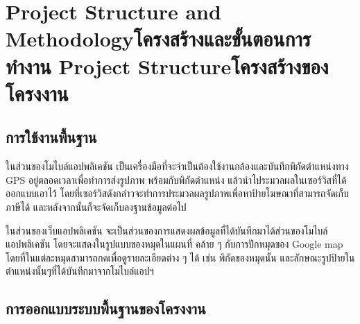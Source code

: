 \chapter{\ifproject%
\ifenglish Project Structure and Methodology\else โครงสร้างและขั้นตอนการทำงาน\fi
\else%
\ifenglish Project Structure\else โครงสร้างของโครงงาน\fi
\fi
}

\makeatletter


\makeatother

\section{การใช้งานพื้นฐาน}
ในส่วนของโมไบล์แอปพลิเคชัน เป็นเครื่องมือที่จะจำเป็นต้องใช้งานกล้องและบันทึกพิกัดตำแหน่งทาง GPS อยู่ตลอดเวลาเพื่อทำการส่งรูปภาพ 
พร้อมกับพิกัดตำแหน่ง แล้วนำไประมวลผลในเซอร์วิสที่ได้ออกแบบเอาไว้ โดยที่เซอร์วิสดังกล่าวจะทำการประมวลผลรูปภาพเพื่อหาป้ายโฆษณาที่สามารถจัดเก็บภาษีได้ 
และหลังจากนั้นก็จะจัดเก็บลงฐานข้อมูลต่อไป 

ในส่วนของเว็บแอปพลิเคชัน จะเป็นส่วนของการแสดงผลข้อมูลที่ได้บันทึกมาได้ส่วนของโมไบล์แอปพลิเคชัน โดยจะแสดงในรูปแบบของหมุดในแผนที่ 
คล้าย ๆ กับการปักหมุดของ Google map โดยที่ในแต่ละหมุดสามารถกดเพื่อดูรายละเอียดต่าง ๆ ได้ เช่น พิกัดของหมุดนั้น 
และลักษณะรูปป้ายในตำแหน่งนั้นๆที่ได้บันทีกมาจากโมไบล์แอปฯ 

\section{การออกแบบระบบพื้นฐานของโครงงาน}
